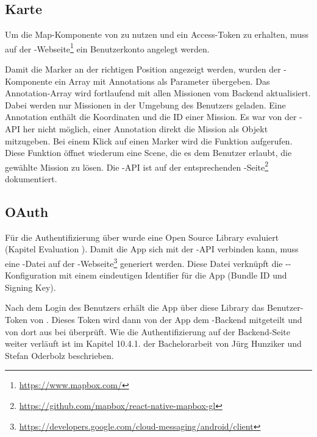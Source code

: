 \subsection{Karte}
Um die Map-Komponente von  zu nutzen und ein Access-Token zu erhalten, muss auf der -Webseite\footnote{\url{https://www.mapbox.com/}} ein Benutzerkonto angelegt werden. 

Damit die Marker an der richtigen Position angezeigt werden, wurden der -Komponente ein Array mit Annotations als Parameter übergeben. 
Das Annotation-Array wird fortlaufend mit allen Missionen vom \gls{Backend} aktualisiert. 
Dabei werden nur Missionen in der Umgebung des Benutzers geladen. 
Eine Annotation enthält die Koordinaten und die ID einer Mission. 
Es war von der -\gls{API} her nicht möglich, einer Annotation direkt die Mission als Objekt mitzugeben. 
Bei einem Klick auf einen Marker wird die Funktion  aufgerufen.
Diese Funktion öffnet wiederum eine Scene, die es dem Benutzer erlaubt, die gewählte Mission zu lösen.
Die -\gls{API} ist auf der entsprechenden -Seite\footnote{\url{https://github.com/mapbox/react-native-mapbox-gl}} dokumentiert. 


\subsection{OAuth}
Für die Authentifizierung über  wurde eine Open Source \gls{Library} evaluiert (Kapitel Evaluation ). 
Damit die App sich mit der -\gls{API} verbinden kann, muss eine -Datei auf der -Webseite\footnote{\url{https://developers.google.com/cloud-messaging/android/client}} generiert werden. 
Diese Datei verknüpft die --Konfiguration mit einem eindeutigen Identifier für die App (Bundle ID und Signing Key).

Nach dem Login des Benutzers erhält die App über diese \gls{Library} das Benutzer-Token von .
Dieses Token wird dann von der App dem \kort{}-\gls{Backend} mitgeteilt und von dort aus bei  überprüft. 
Wie die Authentifizierung auf der \gls{Backend}-Seite weiter verläuft ist im Kapitel 10.4.1. der Bachelorarbeit von Jürg Hunziker und Stefan Oderbolz beschrieben.\cite{ba-kort-2012}